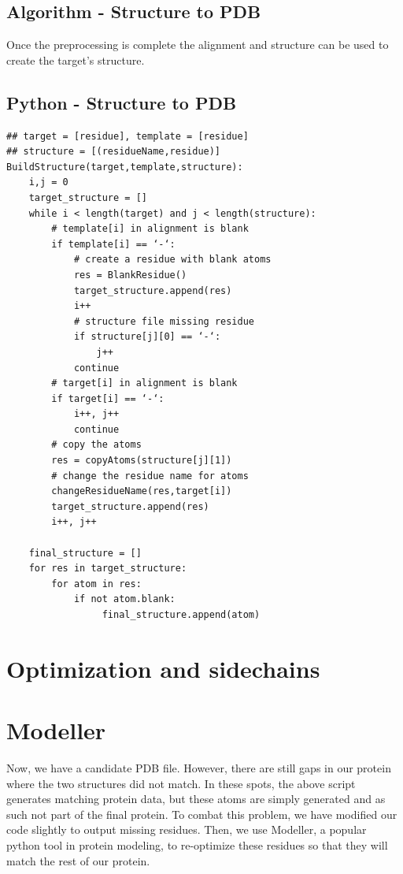 \documentclass{article}
\begin{document}
\newpage
\subsection{Algorithm - Structure to PDB}

Once the preprocessing is complete the alignment and structure can be used to create the target's structure.

\subsection{Python - Structure to PDB}

\begin{lstlisting}
## target = [residue], template = [residue]
## structure = [(residueName,residue)]
BuildStructure(target,template,structure):
    i,j = 0
    target_structure = []
    while i < length(target) and j < length(structure):
        # template[i] in alignment is blank
        if template[i] == ‘-‘:
            # create a residue with blank atoms
            res = BlankResidue()
            target_structure.append(res)
            i++
            # structure file missing residue
            if structure[j][0] == ‘-‘:
                j++
            continue
        # target[i] in alignment is blank
        if target[i] == ‘-‘:
            i++, j++
            continue
        # copy the atoms
        res = copyAtoms(structure[j][1])
        # change the residue name for atoms
        changeResidueName(res,target[i])
        target_structure.append(res)
        i++, j++
    
    final_structure = []
    for res in target_structure:
        for atom in res:
            if not atom.blank:
                 final_structure.append(atom)
\end{lstlisting}


\section{Optimization and sidechains}

\section{Modeller}

Now, we have a candidate PDB file.  However, there are still gaps in our protein where the two structures did not match.  In these spots, the above script generates matching protein data, but these atoms are simply generated and as such not part of the final protein.  To combat this problem, we have modified our code slightly to output missing residues.  Then, we use Modeller, a popular python tool in protein modeling, to re-optimize these residues so that they will match the rest of our protein. 
\end{document}
